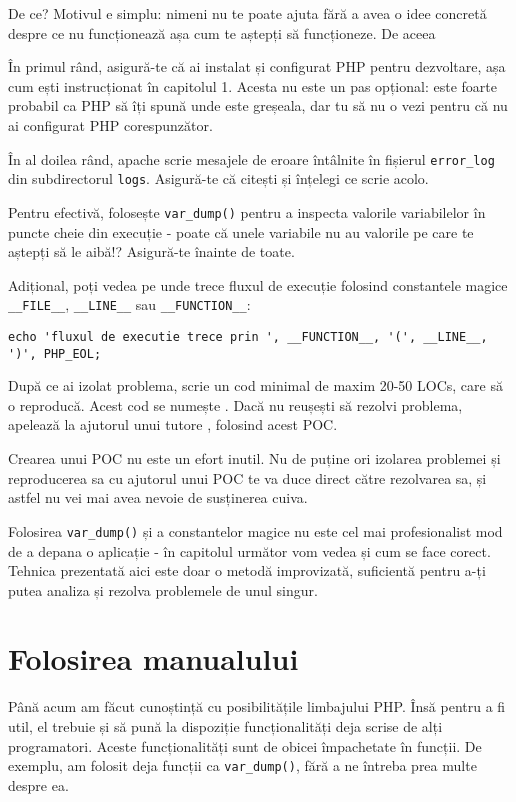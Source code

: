 De ce? Motivul e simplu: nimeni nu te poate ajuta fără
a avea o idee concretă despre ce nu funcționează așa cum te
aștepți să funcționeze. De aceea


În primul rând, asigură-te că ai instalat și configurat PHP
pentru dezvoltare, așa cum ești instrucționat în capitolul 1.
Acesta nu este un pas opțional: este foarte probabil ca PHP
să îți spună unde este greșeala, dar tu să nu o vezi pentru
că nu ai configurat PHP corespunzător.

În al doilea rând, apache scrie mesajele de eroare întâlnite
în fișierul \texttt{error\_log} din subdirectorul \texttt{logs}.
Asigură-te că citești și înțelegi ce scrie acolo.

Pentru  efectivă, folosește \texttt{var\_dump()}
pentru a inspecta valorile variabilelor în puncte
cheie din execuție - poate că unele variabile nu au
valorile pe care te aștepți să le aibă!? Asigură-te
înainte de toate.

Adițional, poți vedea pe unde trece fluxul de execuție
folosind constantele magice \texttt{\_\_FILE\_\_},
\texttt{\_\_LINE\_\_} sau \texttt{\_\_FUNCTION\_\_}:
\begin{lstlisting}
echo 'fluxul de executie trece prin ', __FUNCTION__, '(', __LINE__, ')', PHP_EOL;
\end{lstlisting}

După ce ai izolat problema, scrie un cod minimal de maxim
20-50 LOCs, care să o reproducă. Acest cod se numește
. Dacă nu reușești să rezolvi
problema, apelează la ajutorul unui tutore {\phpro},
folosind acest POC.

Crearea unui POC nu este un efort inutil. Nu de puține ori
izolarea problemei și reproducerea sa cu ajutorul
unui POC te va duce direct către rezolvarea sa,
și astfel nu vei mai avea nevoie de susținerea cuiva.

Folosirea \texttt{var\_dump()} și a constantelor magice
nu este cel mai profesionalist mod de a depana o aplicație -
în capitolul următor vom vedea și cum se face corect.
Tehnica prezentată aici este doar o metodă improvizată,
suficientă pentru a-ți putea analiza și rezolva
problemele de unul singur.

\section{Folosirea manualului}
Până acum am făcut cunoștință cu posibilitățile limbajului PHP.
Însă pentru a fi util, el trebuie și să pună la dispoziție
funcționalități deja scrise de alți programatori. Aceste
funcționalități sunt de obicei împachetate în funcții.
De exemplu, am folosit deja funcții ca \texttt{var\_dump()},
fără a ne întreba prea multe despre ea.

